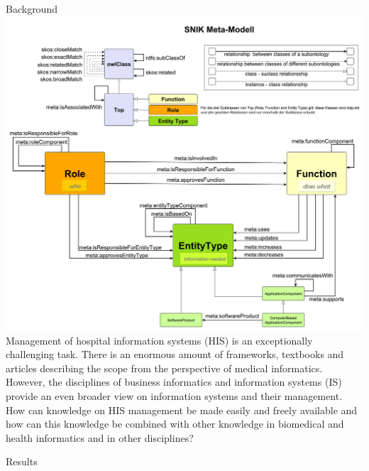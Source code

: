 \documentclass[portrait,final,a0paper,fontscale=0.277]{baposter}
\begin{document}
\begin{poster}
\begin{posterbox}[name=background,column=0,row=0]{Background}
\centering\includegraphics[width=\columnwidth]{img/metamodel.pdf}
Management of hospital information systems (HIS) is an exceptionally challenging task.
There is an enormous amount of frameworks, textbooks and articles describing the scope from the perspective of medical informatics.
However, the disciplines of business informatics and information systems (IS) provide an even broader view on information systems and their management.
How can knowledge on HIS management be made easily and freely available and how can this knowledge be combined with other knowledge in biomedical and health informatics and in other disciplines?
\vspace{0.3em}
\end{posterbox}
\begin{posterbox}[name=results,below=background]{Results}


\end{posterbox}
\end{poster}
\end{document}
